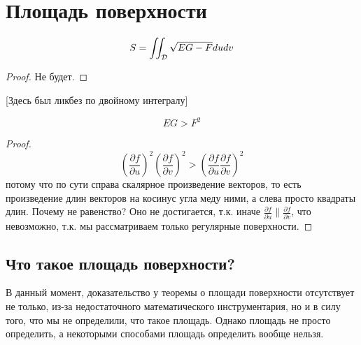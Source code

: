 \documentclass[main]{subfiles}
\begin{document}
\chapter{Площадь поверхности}
\begin{theorem}
    \[S = \iint_{\mathcal{D}} \sqrt{EG - F} dudv\]
\end{theorem}
\begin{proof}
    Не будет.
\end{proof}
[Здесь был ликбез по двойному интегралу]
\begin{theorem}
    \[EG > F^2\]
\end{theorem}
\begin{proof}
    \[\left( \frac{\partial f}{\partial u}\right)^2 \left( \frac{\partial f}{\partial v}\right)^2 > \left(\frac{\partial f}{\partial u}\frac{\partial f}{\partial v}\right)^2\]
    потому что по сути справа скалярное произведение векторов, то есть произведение длин векторов на косинус угла меду ними, а слева просто квадраты длин.
    Почему не равенство? Оно не достигается, т.к. иначе $\frac{\partial f}{\partial u} \parallel \frac{\partial f}{\partial v}$, что невозможно, т.к. мы рассматриваем только регулярные поверхности.
\end{proof}

\section{Что такое площадь поверхности?}
В данный момент, доказательство у теоремы о площади поверхности отсутствует не только,
из-за недостаточного математического инструментария, но и в силу того, что мы не определили, что такое площадь.
Однако площадь не просто определить, а некоторыми способами площадь определить вообще нельзя.
\end{document}
